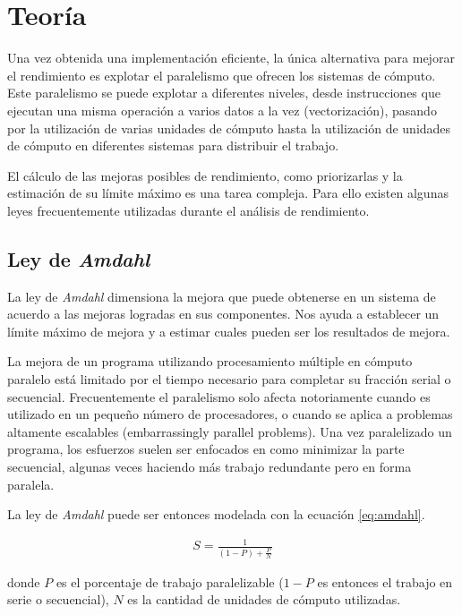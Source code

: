 \documentclass[a4paper]{report}
\begin{document}
\section{Teoría}

Una vez obtenida una implementación eficiente, la única alternativa para mejorar el rendimiento es explotar el paralelismo que
ofrecen los sistemas de cómputo. Este paralelismo se puede explotar a diferentes niveles, desde instrucciones que ejecutan una misma operación a varios
datos a la vez (vectorización), pasando por la utilización de varias unidades de cómputo hasta la utilización de unidades de cómputo en diferentes sistemas para distribuir el trabajo.

\bigskip

El cálculo de las mejoras posibles de rendimiento, como priorizarlas y la estimación de su límite máximo es una tarea compleja.
Para ello existen algunas leyes frecuentemente utilizadas durante el análisis de rendimiento.

\subsection{Ley de {\it Amdahl}}

 La ley de {\it Amdahl} \cite{amdahl} dimensiona la mejora que puede obtenerse en un sistema de acuerdo a las mejoras logradas en sus
componentes. Nos ayuda a establecer un límite máximo de mejora y a estimar cuales pueden ser los resultados de mejora.

\bigskip

La mejora de un programa utilizando procesamiento múltiple en cómputo paralelo
está limitado por el tiempo necesario para completar su fracción serial o
secuencial. Frecuentemente el paralelismo solo afecta notoriamente cuando es
utilizado en un pequeño número de procesadores, o cuando se aplica a problemas
altamente escalables (embarrassingly parallel problems). Una vez paralelizado un
programa, los esfuerzos suelen ser enfocados en como minimizar
la parte secuencial, algunas veces haciendo más trabajo redundante pero en forma paralela.

\bigskip

La ley de {\it Amdahl} puede ser entonces modelada con la ecuación \ref{eq:amdahl}.

\begin{eqnarray}
\label{eq:amdahl}
S = \frac{1}{(1-P) + \frac{P}{N}}
\end{eqnarray}

donde $ P $ es el porcentaje de trabajo paralelizable ($ 1-P $ es entonces el trabajo en serie o secuencial), $ N $ es la cantidad de unidades de cómputo utilizadas.
\end{document}
